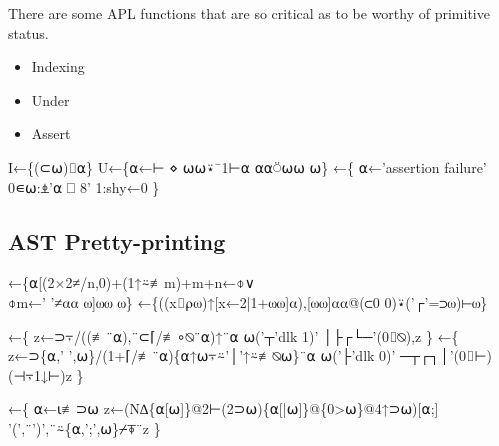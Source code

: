 \documentclass{article}%
\begin{document}
There are some APL functions that are so critical as to be worthy 
of primitive status.

\begin{itemize}
        \item Indexing
        \item Under
        \item Assert
\end{itemize}

\nwenddocs{}\endmoddef\nwstartdeflinemarkup{}\nwenddeflinemarkup
I←\{(⊂⍵)⌷⍺\}
U←\{⍺←⊢ ⋄ ⍵⍵⍣¯1⊢⍺ ⍺⍺⍥⍵⍵ ⍵\}
←\{
        ⍺←'assertion failure'
        0∊⍵:⍎'⍺ ⎕ 8'
        1:shy←0
\}
\eatline
{}\nwendcode{}\nwdocspar
\subsection{AST Pretty-printing}

\nwenddocs{}\endmoddef\nwstartdeflinemarkup{}\nwenddeflinemarkup
{}←\{⍺[(2×2≠/n,0)+(1↑⍨≢m)+m+n←⌽∨\\⌽m←' '≠⍺⍺ ⍵]⍵⍵ ⍵\}
←\{((x⌷⍴⍵)↑[x←2|1+⍵⍵]⍺),[⍵⍵]⍺⍺@(⊂0 0)⍣('┌'=⊃⍵)⊢⍵\}

←\{
        z←⊃⍪/((≢¨⍺),¨⊂⌈/≢∘⍉¨⍺)↑¨⍺
        ⍵('┬'dlk 1)' │├┌└─'(0⌷⍉),z
\}
←\{
        z←⊃\{⍺,' ',⍵\}/(1+⌈/≢¨⍺)\{⍺↑⍵⍪⍨'│'↑⍨≢⍉⍵\}¨⍺
        ⍵('├'dlk 0)' ─┬┌┐│'(0⌷⊢)(⊣⍪1↓⊢)z
\}

←\{
        ⍺←⍳≢⊃⍵
        z←(N∆\{⍺[⍵]\}@2⊢(2⊃⍵)\{⍺[|⍵]\}@\{0>⍵\}@4↑⊃⍵)[⍺;]
        '(',¨')',¨⍨\{⍺,';',⍵\}⌿⍕¨z
\}
\end{document}
